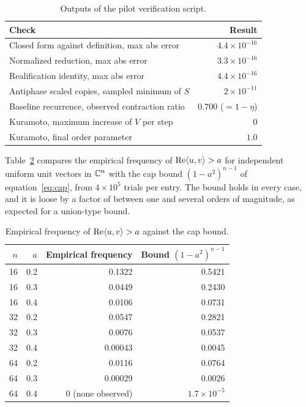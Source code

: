 \begin{table}[t]
\centering
\small
\renewcommand{\arraystretch}{1.2}
\begin{tabular}{@{}lr@{}}
\toprule
Check & Result\\
\midrule
Closed form against definition, max abs error & $4.4\times10^{-16}$\\
Normalized reduction, max abs error & $3.3\times10^{-16}$\\
Realification identity, max abs error & $4.4\times10^{-16}$\\
Antiphase scaled copies, sampled minimum of $S$ & $2\times10^{-11}$\\
Baseline recurrence, observed contraction ratio & $0.700$ ($=1-\eta$)\\
Kuramoto, maximum increase of $V$ per step & $0$\\
Kuramoto, final order parameter & $1.0$\\
\bottomrule
\end{tabular}
\caption{Outputs of the pilot verification script.}\label{tab:pilot}
\end{table}

Table~\ref{tab:falseact} compares the empirical frequency of $\operatorname{Re}\langle u,v\rangle>a$ for independent uniform unit vectors in $\mathbb{C}^n$ with the cap bound $(1-a^2)^{n-1}$ of equation~\eqref{eq:cap}, from $4\times10^5$ trials per entry. The bound holds in every case, and it is loose by a factor of between one and several orders of magnitude, as expected for a union-type bound.

\begin{table}[t]
\centering
\small
\renewcommand{\arraystretch}{1.15}
\begin{tabular}{@{}rrrr@{}}
\toprule
$n$ & $a$ & Empirical frequency & Bound $(1-a^2)^{n-1}$\\
\midrule
16 & 0.2 & 0.1322 & 0.5421\\
16 & 0.3 & 0.0449 & 0.2430\\
16 & 0.4 & 0.0106 & 0.0731\\
32 & 0.2 & 0.0547 & 0.2821\\
32 & 0.3 & 0.0076 & 0.0537\\
32 & 0.4 & 0.00043 & 0.0045\\
64 & 0.2 & 0.0116 & 0.0764\\
64 & 0.3 & 0.00029 & 0.0026\\
64 & 0.4 & 0 (none observed) & $1.7\times10^{-5}$\\
\bottomrule
\end{tabular}
\caption{Empirical frequency of $\operatorname{Re}\langle u,v\rangle>a$ against the cap bound.}\label{tab:falseact}
\end{table}

